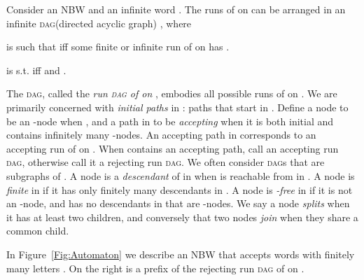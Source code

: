 \documentclass{LMCS}
\newcommand\hide[1]{}
\newcommand{\DAG}{\textsc{dag}\xspace}
\newcommand{\DAGs}{\textsc{dag}s\xspace}
\newcommand{\standout}[1]{\medskip \noindent {\bf #1:}}
\begin{document}
\standout{Run \DAGs} 
Consider an NBW  and an infinite word . The runs of  on  can
be arranged in an infinite \DAG (directed acyclic graph) , where 
\begin{iteMize}{}
\cbstart
\item  is such that  iff some finite or infinite run  of  on  has
.
\cbend
\item  is
s.t.   iff  and .
\end{iteMize}
The \DAG , called the \emph{run \textsc{dag} of  on }, embodies all possible runs
of  on . We are primarily concerned with \emph{initial paths} in : paths that start in
.  Define a node  to be an -node when , and a path in
 to be \emph{accepting} when it is both initial and contains infinitely many -nodes.  An
accepting path in  corresponds to an accepting run of  on . When  contains an accepting path, 
call  an accepting run \DAG, otherwise call it a rejecting run \DAG.  We often consider
\DAGs  that are subgraphs of . A node  is a \emph{descendant} of  in  when  is
reachable from  in . A node  is \emph{finite} in  if it has only finitely many
descendants in .  A node  is \emph{-free} in  if it is not an -node, and has no
descendants in  that are -nodes. We say a node \emph{splits} when it has at least two
children, and conversely that two nodes \emph{join} when they share a common child.

\begin{exa}\label{ExampleOne}
In Figure~\ref{Fig:Automaton} we describe an NBW  that accepts
words with finitely many letters
. On the right is a prefix of the rejecting run \DAG of  on \hide{,
the word with an increasing number of 's between successive 's}. 
\end{exa}
\end{document}
